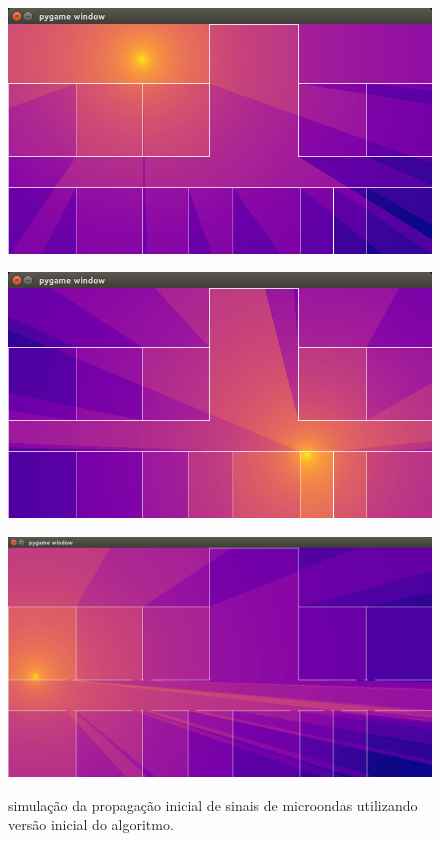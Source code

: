 \documentclass[
	12pt,				%
	openright,			%
	twoside,			%
	a4paper,			%
	english,			%
	french,				%
	spanish,			%
	brazil				%
	]{abntex2}
\begin{document}
\begin{figure}[htb]
	\label{capturas}
	\caption{simulação da propagação inicial de sinais de microondas utilizando versão inicial do algoritmo.}
	\centering
	\begin{minipage}{0.4\textwidth}
		\centering \label{captura_1}
		\includegraphics[scale=0.3]{images/captura-1.jpg}
	\end{minipage}
	\hfill
	\begin{minipage}{0.4\textwidth}
		\centering \label{captura_2}
		\includegraphics[scale=0.3]{images/captura-2.jpg}
	\end{minipage}
	\hfill
	\begin{minipage}{0.4\textwidth}
		\centering \label{captura_3}
		\includegraphics[scale=0.2]{images/captura-3.jpg}

\end{minipage}
\end{figure}
\end{document}
